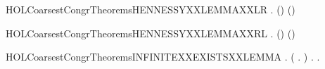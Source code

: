 \newcommand{\HOLCoarsestCongrTheoremsHENNESSYXXLEMMA}{\UseVerbatim{HOLCoarsestCongrTheoremsHENNESSYXXLEMMA}}
\begin{SaveVerbatim}{HOLCoarsestCongrTheoremsHENNESSYXXLEMMAXXLR}
\HOLTokenTurnstile{} \HOLSymConst{\HOLTokenForall{}} .
          \HOLSymConst{\HOLTokenImp{}}
          \HOLSymConst{\HOLTokenDisj{}}   (\HOLConst{\ensuremath{\tau}}) \HOLSymConst{\HOLTokenDisj{}}  (\HOLConst{\ensuremath{\tau}}) 
\end{SaveVerbatim}
\newcommand{\HOLCoarsestCongrTheoremsHENNESSYXXLEMMAXXLR}{\UseVerbatim{HOLCoarsestCongrTheoremsHENNESSYXXLEMMAXXLR}}
\begin{SaveVerbatim}{HOLCoarsestCongrTheoremsHENNESSYXXLEMMAXXRL}
\HOLTokenTurnstile{} \HOLSymConst{\HOLTokenForall{}} .
          \HOLSymConst{\HOLTokenDisj{}}   (\HOLConst{\ensuremath{\tau}}) \HOLSymConst{\HOLTokenDisj{}}  (\HOLConst{\ensuremath{\tau}})  \HOLSymConst{\HOLTokenImp{}}
         
\end{SaveVerbatim}
\newcommand{\HOLCoarsestCongrTheoremsHENNESSYXXLEMMAXXRL}{\UseVerbatim{HOLCoarsestCongrTheoremsHENNESSYXXLEMMAXXRL}}
\begin{SaveVerbatim}{HOLCoarsestCongrTheoremsINFINITEXXEXISTSXXLEMMA}
\HOLTokenTurnstile{} \HOLSymConst{\HOLTokenForall{}}  .
         \HOLSymConst{\HOLTokenImp{}}
         \HOLSymConst{\HOLTokenConj{}}   \HOLSymConst{\HOLTokenConj{}}
       (\HOLSymConst{\HOLTokenForall{}} .  \HOLConst{\HOLTokenIn{}}  \HOLSymConst{\HOLTokenConj{}}  \HOLConst{\HOLTokenIn{}}  \HOLSymConst{\HOLTokenConj{}}  \HOLSymConst{\HOLTokenNotEqual{}}  \HOLSymConst{\HOLTokenImp{}} \HOLSymConst{\HOLTokenNeg{}}  ) \HOLSymConst{\HOLTokenImp{}}
       \HOLSymConst{\HOLTokenExists{}}.  \HOLConst{\HOLTokenIn{}}  \HOLSymConst{\HOLTokenConj{}} \HOLSymConst{\HOLTokenForall{}}.  \HOLConst{\HOLTokenIn{}}  \HOLSymConst{\HOLTokenImp{}} \HOLSymConst{\HOLTokenNeg{}}  
\end{SaveVerbatim}

